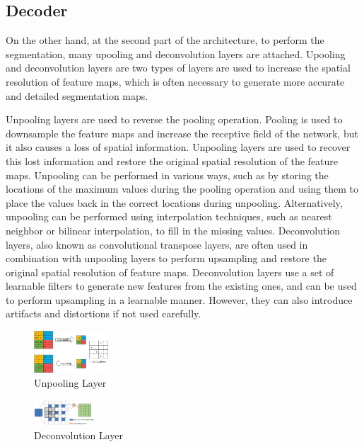 \documentclass{article}
\begin{document}
\subsection{Decoder}
On the other hand, at the second part of the architecture, to perform the segmentation, many upooling and deconvolution layers are attached. Upooling and deconvolution layers are two types of layers are used to increase the spatial resolution of feature maps, which is often necessary to generate more accurate and detailed segmentation maps.
\begin{multicols}{2}
    Unpooling layers are used to reverse the pooling operation. 
Pooling is used to downsample the feature maps and increase the receptive field of the network, but it also causes a loss of spatial information. 
Unpooling layers are used to recover this lost information and restore the original spatial resolution of the feature maps. Unpooling can be performed in various ways, such as by storing the locations of the maximum values during the pooling operation and using them to place the values back in the correct locations during unpooling. Alternatively, unpooling can be performed using interpolation techniques, such as nearest neighbor or bilinear interpolation, to fill in the missing values.\columnbreak
Deconvolution layers, also known as convolutional transpose layers, are often used in combination with unpooling layers to perform upsampling and restore the original spatial resolution of feature maps. Deconvolution layers use a set of learnable filters to generate new features from the existing ones, and can be used to perform upsampling in a learnable manner. However, they can also introduce artifacts and distortions if not used carefully.
\end{multicols}
\begin{multicols}{2}
    \begin{figure}[H]
        \begin{center}
        \includegraphics[width=0.25\textwidth]{img/unpoolingLayer.png}
        \caption{Unpooling Layer}
        \label{fig:unpoolL}
    \end{center}
\end{figure}
    \columnbreak
    \begin{figure}[H]
        \begin{center}
        \includegraphics[width=0.2\textwidth]{img/deconvolutionLayer.png}
        \caption{Deconvolution Layer}
        \label{fig:deconL}
    \end{center}
\end{figure}
\end{multicols}
\end{document}
